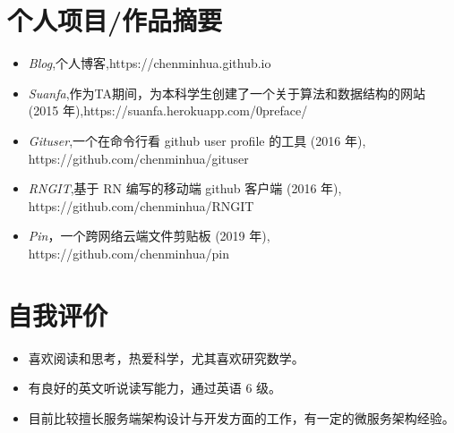 \documentclass{resume}
\begin{document}
\section{个人项目/作品摘要}
\begin{itemize}[parsep=0.2ex]
  \item \textit{Blog},个人博客,https://chenminhua.github.io
  \item \textit{Suanfa},作为TA期间，为本科学生创建了一个关于算法和数据结构的网站 (2015 年),https://suanfa.herokuapp.com/0preface/
  \item \textit{Gituser},一个在命令行看 github user profile 的工具 (2016 年), https://github.com/chenminhua/gituser
  \item \textit{RNGIT},基于 RN 编写的移动端 github 客户端 (2016 年), https://github.com/chenminhua/RNGIT 
  \item \textit{Pin}，一个跨网络云端文件剪贴板 (2019 年), https://github.com/chenminhua/pin

\end{itemize}

\section{自我评价}
\begin{itemize}[parsep=0.2ex]
  \item 喜欢阅读和思考，热爱科学，尤其喜欢研究数学。
  \item 有良好的英文听说读写能力，通过英语 6 级。 
  \item 目前比较擅长服务端架构设计与开发方面的工作，有一定的微服务架构经验。
\end{itemize}

%
%
\end{document}
